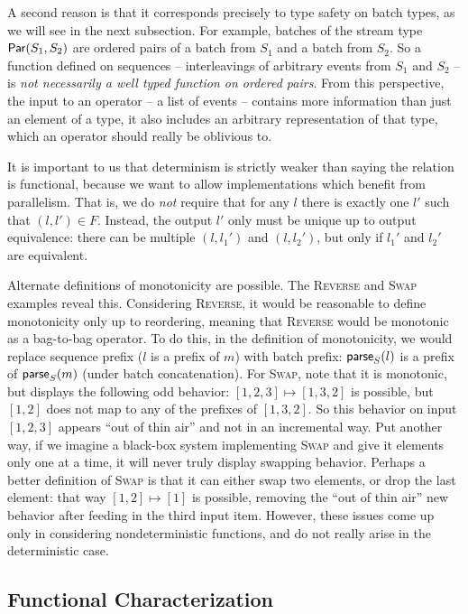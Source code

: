 A second reason is that it corresponds precisely to type safety on batch types, as we will see in the next subsection. For example, batches of the stream type $\parcomp{S_1}{S_2}$ are ordered pairs of a batch from $S_1$ and a batch from $S_2$. So a function defined on sequences -- interleavings of arbitrary events from $S_1$ and $S_2$ -- is \emph{not necessarily a well typed function on ordered pairs}.
From this perspective, the input to an operator -- a list of events -- contains more information than just an element of a type, it also includes an arbitrary representation of that type, which an operator should really be oblivious to.

It is important to us that determinism is strictly weaker than saying the relation is functional, because we want to allow implementations which benefit from parallelism. That is, we do \emph{not} require that for any $l$ there is exactly one $l'$ such that $(l, l') \in F$. Instead, the output $l'$ only must be unique up to output equivalence: there can be multiple $(l, l_1')$ and $(l, l_2')$, but only if $l_1'$ and $l_2'$ are equivalent.

Alternate definitions of monotonicity are possible.
The \textsc{Reverse} and \textsc{Swap} examples reveal this.
Considering \textsc{Reverse}, it would be reasonable to define monotonicity only up to reordering, meaning that \textsc{Reverse} would be monotonic as a bag-to-bag operator.
To do this, in the definition of monotonicity, we would replace sequence prefix ($l$ is a prefix of $m$) with batch prefix: $\parselin{l}{S}$ is a prefix of $\parselin{m}{S}$ (under batch concatenation).
For \textsc{Swap}, note that it is monotonic, but displays the following odd behavior: $[1, 2, 3] \mapsto [1, 3, 2]$ is possible, but $[1, 2]$ does not map to any of the prefixes of $[1, 3, 2]$. So this behavior on input $[1, 2, 3]$ appears ``out of thin air'' and not in an incremental way. Put another way, if we imagine a black-box system implementing \textsc{Swap} and give it elements only one at a time, it will never truly display swapping behavior. Perhaps a better definition of \textsc{Swap} is that it can either swap two elements, or drop the last element: that way $[1, 2] \mapsto [1]$ is possible, removing the ``out of thin air'' new behavior after feeding in the third input item. However, these issues come up only in considering nondeterministic functions,
and do not really arise in the deterministic case.

\subsection{Functional Characterization}


